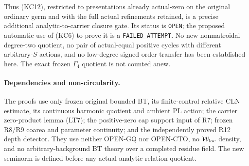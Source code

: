 Thus (KC12), restricted to presentations already actual-zero on
the original ordinary germ and with the full actual refinements
retained, is a precise additional analytic-to-carrier closure
gate. Its status is \texttt{OPEN}; the proposed automatic use
of (KC6) to prove it is a \texttt{FAILED\_ATTEMPT}.
No new nonmatroidal degree-two quotient, no pair of actual-equal
positive cycles with different arbitrary-\(S\) actions, and no
low-degree signed order transfer has been established here.
The exact frozen \(\Gamma_4\) quotient is not counted anew.

\paragraph{Dependencies and non-circularity.}
The proofs use only frozen original bounded BT, its finite-control
relative CLN estimate, its continuous harmonic quotient and
ambient PL action; the carrier zero-product lemma (LT7);
the positive-zero cap support input of R7; frozen R8/R9 coarea
and parameter continuity; and the independently proved R12
depth detector. They use neither OPEN-GQ nor OPEN-CTO, no
\(\mathcal W_{\rm loc}\) density, and no arbitrary-background
BT theory over a completed residue field. The new seminorm is
defined before any actual analytic relation quotient.

